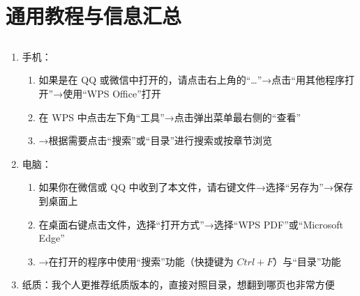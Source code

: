 
\chapter[通用教程与常用信息汇总]{通用教程与信息汇总}

\section*{}

\begin{enumerate}
    \item 手机：
          \begin{enumerate}
              \item 如果是在 QQ 或微信中打开的，请点击右上角的“…”→点击“用其他程序打开”→使用“WPS Office”打开
              \item 在 WPS 中点击左下角“工具”→点击弹出菜单最右侧的“查看”
              \item →根据需要点击“搜索”或“目录”进行搜索或按章节浏览
          \end{enumerate}
    \item 电脑：
          \begin{enumerate}
              \item 如果你在微信或 QQ 中收到了本文件，请右键文件→选择“另存为”→保存到桌面上
              \item 在桌面右键点击文件，选择“打开方式”→选择“WPS PDF”或“Microsoft Edge”
              \item →在打开的程序中使用“搜索”功能（快捷键为 $Ctrl +F$）与“目录”功能
          \end{enumerate}
    \item 纸质：我个人更推荐纸质版本的，直接对照目录，想翻到哪页也非常方便
\end{enumerate}

